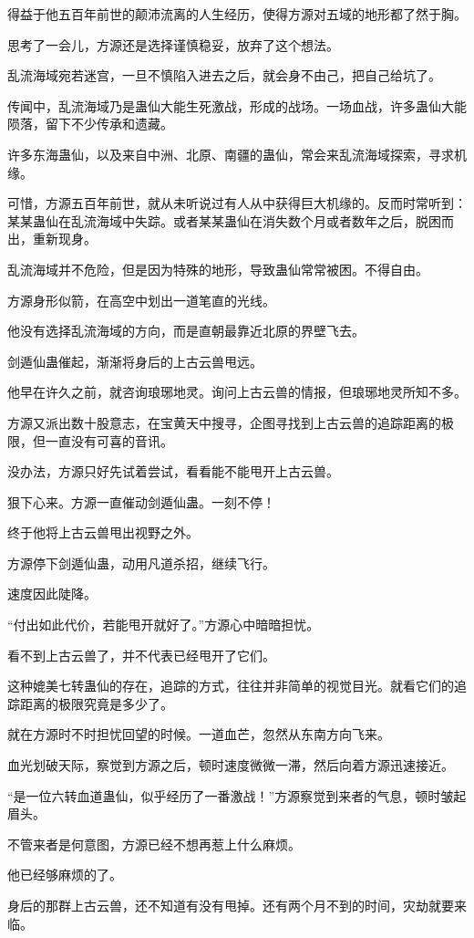 \begin{this_body}
得益于他五百年前世的颠沛流离的人生经历，使得方源对五域的地形都了然于胸。

思考了一会儿，方源还是选择谨慎稳妥，放弃了这个想法。

乱流海域宛若迷宫，一旦不慎陷入进去之后，就会身不由己，把自己给坑了。

传闻中，乱流海域乃是蛊仙大能生死激战，形成的战场。一场血战，许多蛊仙大能陨落，留下不少传承和遗藏。

许多东海蛊仙，以及来自中洲、北原、南疆的蛊仙，常会来乱流海域探索，寻求机缘。

可惜，方源五百年前世，就从未听说过有人从中获得巨大机缘的。反而时常听到：某某蛊仙在乱流海域中失踪。或者某某蛊仙在消失数个月或者数年之后，脱困而出，重新现身。

乱流海域并不危险，但是因为特殊的地形，导致蛊仙常常被困。不得自由。

方源身形似箭，在高空中划出一道笔直的光线。

他没有选择乱流海域的方向，而是直朝最靠近北原的界壁飞去。

剑遁仙蛊催起，渐渐将身后的上古云兽甩远。

他早在许久之前，就咨询琅琊地灵。询问上古云兽的情报，但琅琊地灵所知不多。

方源又派出数十股意志，在宝黄天中搜寻，企图寻找到上古云兽的追踪距离的极限，但一直没有可喜的音讯。

没办法，方源只好先试着尝试，看看能不能甩开上古云兽。

狠下心来。方源一直催动剑遁仙蛊。一刻不停！

终于他将上古云兽甩出视野之外。

方源停下剑遁仙蛊，动用凡道杀招，继续飞行。

速度因此陡降。

“付出如此代价，若能甩开就好了。”方源心中暗暗担忧。

看不到上古云兽了，并不代表已经甩开了它们。

这种媲美七转蛊仙的存在，追踪的方式，往往并非简单的视觉目光。就看它们的追踪距离的极限究竟是多少了。

就在方源时不时担忧回望的时候。一道血芒，忽然从东南方向飞来。

血光划破天际，察觉到方源之后，顿时速度微微一滞，然后向着方源迅速接近。

“是一位六转血道蛊仙，似乎经历了一番激战！”方源察觉到来者的气息，顿时皱起眉头。

不管来者是何意图，方源已经不想再惹上什么麻烦。

他已经够麻烦的了。

身后的那群上古云兽，还不知道有没有甩掉。还有两个月不到的时间，灾劫就要来临。


\end{this_body}
